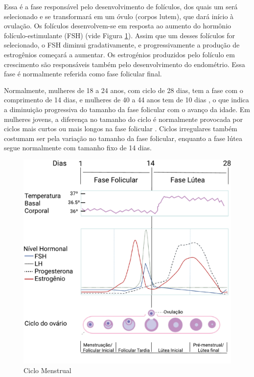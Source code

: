 Essa é a fase responsável pelo desenvolvimento de folículos, dos quais um
será selecionado e se transformará em um óvulo (corpos lutem), que dará início
à ovulação. Os folículos desenvolvem-se em resposta ao aumento do hormônio
folículo-estimulante (FSH) (vide Figura \ref{fig01}). Assim que um desses 
folículos for selecionado, o FSH diminui gradativamente, e progressivamente a produção de
estrogênios começará a aumentar. Os estrogénios produzidos pelo folículo em
crescimento são responsáveis também pelo desenvolvimento do endométrio. Essa fase é normalmente 
referida como fase folicular final.


Normalmente, mulheres de 18 a 24 anos, com ciclo de 28 dias, tem a fase com
o comprimento de 14 dias, e mulheres de 40 a 44 anos tem de 10 dias
\cite{lenton1984a}, o que indica a diminuição progressiva do tamanho da
fase folicular com o avanço da idade. Em mulheres jovens, a diferença no
tamanho do ciclo é normalmente provocada por ciclos mais curtos ou mais
longos na fase folicular \cite{lenton1984a}. Ciclos irregulares também
costumam ser pela variação no tamanho da fase folicular, enquanto a fase
lútea segue normalmente com tamanho fixo de 14 dias.


\begin{figure}[h]
	\caption{Ciclo Menstrual}
	\begin{center}
	\includegraphics[keepaspectratio=true,scale=0.6]{figuras/ciclomenstrual.pdf}
	\end{center}
    \label{fig01}
\end{figure}



